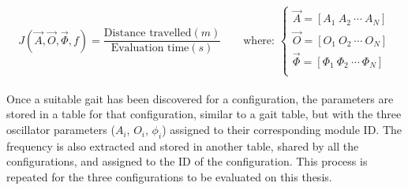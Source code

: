\begin{equation} \label{eq:cost_function}
J( \vec{A}, \vec{O}, \vec{\Phi}, f) = \frac{\text{Distance travelled}(m)}{\text{Evaluation time}(s)} \qquad \text{where: } 
	\begin{cases}
	\vec{A} = [ A_1 ~ A_2 ~ \cdots ~ A_N] \\
	\vec{O} = [ O_1 ~ O_2 ~ \cdots ~ O_N] \\
	\vec{\Phi} = [ \Phi_1 ~ \Phi_2 ~ \cdots ~ \Phi_N] \\
	\end{cases}
\end{equation}\\

Once a suitable gait has been discovered for a configuration, the parameters are stored in a table for that configuration, similar to a gait table, but with the three oscillator parameters ($A_i$, $O_i$, $\phi_i$)  assigned to their corresponding module ID. The frequency is also extracted and stored in another table, shared by all the configurations, and assigned to the ID of the configuration. This process is repeated for the three configurations to be evaluated on this thesis.\\
